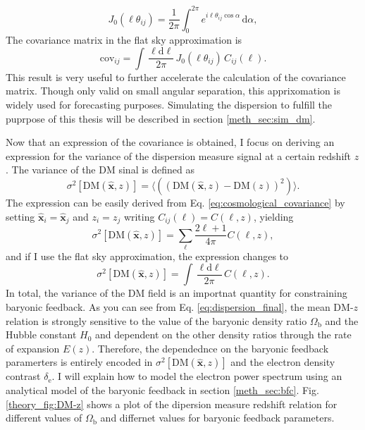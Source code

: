 \begin{equation}
    J_0(\ell \theta_{ij}) = \frac{1}{2\pi} \int_0^{2\pi} e^{i\ell \theta_{ij} \cos\alpha} \, \mathrm{d}\alpha,
\end{equation}
The covariance matrix in the flat sky approximation is
\begin{equation}
    \mathrm{cov}_{ij} = \int  \, \frac{\ell \mathrm{d}\ell}{2\pi} \, J_0(\ell \theta_{ij}) \, C_{ij}(\ell).
\end{equation}
This result is very useful to further accelerate the calculation of the covariance matrix. Though only valid on small angular separation, this apprixomation is widely used for forecasting purposes. Simulating the dispersion to fulfill the puprpose of this thesis will be described in section \ref{meth_sec:sim_dm}. 

Now that an expression of the covariance is obtained, I focus on deriving an expression for the variance of the dispersion measure signal at a certain redshift $z$. The variance of the DM sinal is defined as
\begin{equation}
    \sigma^2\left[\mathrm{DM}(\mathbf{\hat{x}}, z)\right] = \langle \left((\mathrm{DM}(\mathbf{\hat{x}}, z) - \mathrm{DM}(z))^2\right)\rangle.
\end{equation}
The expression can be easily derived from Eq. \ref{eq:cosmological_covariance} by setting $\mathbf{\hat{x}}_i = \mathbf{\hat{x}}_j$ and $z_i = z_j$ writing $C_{ij}(\ell) = C(\ell, z)$, yielding
\begin{equation}
    \sigma^2\left[\mathrm{DM}(\mathbf{\hat{x}}, z)\right] = \sum_{\ell} \frac{2\ell+1}{4\pi} C(\ell, z),
\end{equation}
and if I use the flat sky approximation, the expression changes to
\begin{equation}
    \sigma^2\left[\mathrm{DM}(\mathbf{\hat{x}}, z)\right] = \int  \, \frac{\ell \mathrm{d}\ell}{2\pi} \,  C(\ell, z).
\end{equation}
In total, the variance of the DM field is an importnat quantity for constraining baryonic feedback. As you can see from Eq. \ref{eq:dispersion_final}, the mean DM-$z$ relation is strongly sensitive to the value of the baryonic density ratio $\Omega_\mathrm{b}$ and the Hubble constant $H_0$ and dependent on the other density ratios through the rate of expansion $E(z)$. Therefore, the dependednce on the baryonic feedback paramerters is entirely encoded in $\sigma^2\left[\mathrm{DM}(\mathbf{\hat{x}}, z)\right]$ and the electron density contrast $\delta_\mathrm{e}$. I will explain how to model the electron power spectrum using an analytical model of the baryonic feedback in section \ref{meth_sec:bfc}. Fig. \ref{theory_fig:DM-z} shows a plot of the dipersion measure redshift relation for different values of $\Omega_\mathrm{b}$ and differnet values for baryonic feedback parameters.


